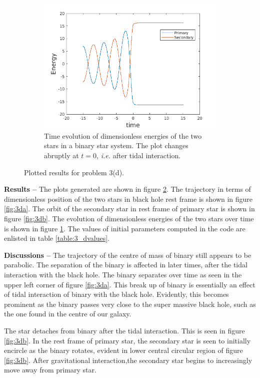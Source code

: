 \documentclass[a4paper]{article}
\begin{document}
\begin{enumerate} [label*=\textbf{(\alph*)}]
\begin{figure}
						\begin{subfigure} {\columnwidth}
							\centering
							\includegraphics[width=.5\columnwidth]{../plots/3d_energy.png}
							\caption{Time evolution of dimensionless energies of the two stars in a binary star system. The plot changes abruptly at \(t=0\), \textit{i.e.} after tidal interaction.}
							\label{fig:3dc}
						\end{subfigure}
						\caption{Plotted results for problem 3(d).}
						\label{fig:3.2}
					\end{figure}
					
					\subitem \textbf{Results  --} 
					The plots generated are shown in figure \ref{fig:3.2}. The trajectory in terms of dimensionless position of the two stars in black hole rest frame is shown in figure \ref{fig:3da}. The orbit of the secondary star in rest frame of primary star is shown in figure \ref{fig:3db}. The evolution of dimensionless energies of the two stars over time is shown in figure \ref{fig:3dc}. The values of initial parameters computed in the code are enlisted in table \ref{table:3_dvalues}.
					
					\subitem \textbf{Discussions  --}
					The trajectory of the centre of mass of binary still appears to be parabolic. The separation of the binary is affected in later times, after the tidal interaction with the black hole. The binary separates over time as seen in the upper left corner of figure \ref{fig:3da}. This break up of binary is essentially an effect of tidal interaction of binary with the black hole. Evidently, this becomes prominent as the binary passes very close to the super massive black hole, such as the one found in the centre of our galaxy.
					
					The star detaches from binary after the tidal interaction. This is seen in figure \ref{fig:3db}. In the rest frame of primary star, the secondary star is seen to initially encircle as the binary rotates, evident in lower central circular region of figure \ref{fig:3db}. After gravitational interaction,the secondary star begins to increasingly move away from primary star.
					

\end{enumerate}
\end{document}
